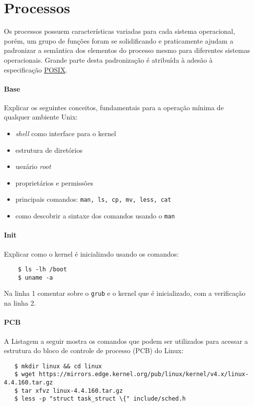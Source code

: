 \section*{Processos}

Os processos possuem características variadas para cada sistema operacional,
porém, um grupo de funções foram se solidificando e praticamente ajudam a
padronizar a semântica dos elementos do processo mesmo para diferentes sistemas
operacionais. Grande parte desta padronização é atribuída à adesão à
especificação \href{http://pubs.opengroup.org/onlinepubs/9699919799/}{POSIX}.

\paragraph{Base} Explicar os seguintes conceitos, fundamentais para a operação
mínima de qualquer ambiente Unix:

\begin{itemize}
\item {\em shell} como interface para o kernel
\item estrutura de diretórios
\item usuário {\em root}
\item proprietários e permissões
\item principais comandos: {\tt man, ls, cp, mv, less, cat}
\item como descobrir a sintaxe dos comandos usando o {\tt man}
\end{itemize}

\paragraph{Init} Explicar como o kernel é inicializado usando os
comandos:

\begin{verbatim}
    $ ls -lh /boot
    $ uname -a
\end{verbatim}

Na linha 1 comentar sobre o {\tt grub} e o kernel que é inicializado,
com a verificação na linha 2.

\paragraph{PCB} A Listagem a seguir mostra os comandos que podem ser
utilizados para acessar a estrutura do bloco de controle de processo (PCB) do
Linux:

\begin{verbatim}
   $ mkdir linux && cd linux
   $ wget https://mirrors.edge.kernel.org/pub/linux/kernel/v4.x/linux-4.4.160.tar.gz
   $ tar xfvz linux-4.4.160.tar.gz
   $ less -p "struct task_struct \{" include/sched.h
\end{verbatim}


